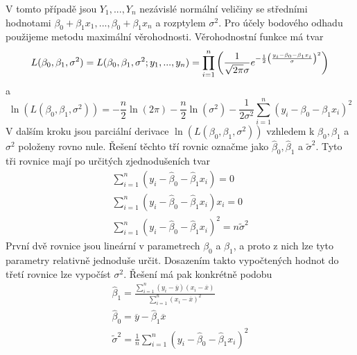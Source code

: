 V tomto případě jsou $Y_1, ..., Y_n$ nezávislé normální veličiny se středními hodnotami $\beta_0 + \beta_1 x_1, ..., \beta_0 + \beta_1 x_n$ a rozptylem $\sigma^2$. Pro účely bodového odhadu použijeme metodu maximální věrohodnosti. Věrohodnostní funkce má tvar
\begin{equation}
L(\beta_0, \beta_1, \sigma^2) = L(\beta_0, \beta_1, \sigma^2; y_1, ..., y_n)\\
= \prod_{i = 1}^n\left(\frac{1}{\sqrt{2 \pi} \sigma}e^{-\frac{1}{2}\left(\frac{y_i - \beta_0 - \beta_1x_i}{\sigma}\right)^2}\right)
\end{equation}
a
\begin{equation*}
\ln\left(L(\beta_0, \beta_1, \sigma^2)\right) = - \frac{n}{2}\ln(2 \pi) - \frac{n}{2}\ln(\sigma^2) - \frac{1}{2 \sigma^2} \sum_{i = 1}^n(y_i - \beta_0 - \beta_1 x_i)^2
\end{equation*}
V dalším kroku jsou parciální derivace $\ln\left(L(\beta_0, \beta_1, \sigma^2)\right)$ vzhledem k $\beta_0, \beta_1$ a $\sigma^2$ položeny rovno nule. Řešení těchto tří rovnic označme jako $\hat{\beta}_0, \hat{\beta}_1$ a $\tilde{\sigma}^2$. Tyto tři rovnice mají po určitých zjednodušeních tvar
\begin{gather}
\sum_{i = 1}^n (y_i - \hat{\beta}_0 - \hat{\beta}_1 x_i) = 0\\
\sum_{i = 1}^n (y_i - \hat{\beta}_0 - \hat{\beta}_1 x_i)x_i = 0\\
\sum_{i = 1}^n (y_i - \hat{\beta}_0 - \hat{\beta}_1 x_i)^2 = n \tilde{\sigma}^2
\end{gather}
První dvě rovnice jsou lineární v parametrech $\beta_0$ a $\beta_1$, a proto z nich lze tyto parametry relativně jednoduše určit. Dosazením takto vypočtených hodnot do třetí rovnice lze vypočíst $\sigma^2$. Řešení má pak konkrétně podobu
\begin{gather}
\hat{\beta}_1 = \frac{\sum_{i = 1}^n (y_i - \overline{y})(x_i - \overline{x})}{\sum_{i = 1}^n (x_i - \overline{x})^2}\\
\hat{\beta}_0 = \overline{y} - \hat{\beta}_1 \overline{x}\\
\tilde{\sigma}^2 = \frac{1}{n} \sum_{i = 1}^n (y_i - \hat{\beta}_0 - \hat{\beta}_1 x_i)^2
\end{gather}

